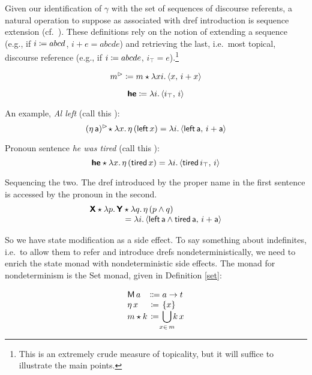 	Given our identification of $\gamma$ with the set of sequences of discourse referents, a natural operation to suppose as associated with dref introduction is sequence extension (cf.~\citealt{Groote:2006, Unger:2012, Charlow:diss}). These definitions rely on the notion of extending a sequence (e.g., if $i \coloneqq abcd$, $i+e = abcde$) and retrieving the last, i.e.~most topical, discourse reference (e.g., if $i \coloneqq abcde$, $i_\top = e$).\footnote{This is an extremely crude measure of topicality, but it will suffice to illustrate the main points.}%
	\begin{defi}
		\[m^\rhd \coloneqq m \star \lambda xi.\,\langle x,\,i + x \rangle\]
	\end{defi}
	\begin{defi}
		\[\textbf{\textsf{he}} \coloneqq \lambda i.\,\langle i_\top,\,i \rangle\]
	\end{defi}
	
	An example, \emph{Al left} (call this ):
	\[(\eta\,\textsf{a})^\rhd\! \star \lambda x.\,\eta\,(\textsf{left}\,x) = \lambda i.\,\langle \textsf{left}\,\textsf{a},\,i+\textsf{a} \rangle\]%
	
	Pronoun sentence \emph{he was tired} (call this ):
	\[\textbf{\textsf{he}} \star \lambda x.\,\eta\,(\textsf{tired}\,x) = \lambda i.\,\langle \textsf{tired}\,i_\top,\,i \rangle\]%
	
	Sequencing the two. The dref introduced by the proper name in the first sentence is accessed by the pronoun in the second. %
	\[\begin{array}{r@{}l}
		\bsf{X} \star \lambda p.\,\bsf{Y}&{}\star \lambda q.\,\eta\,(p \wedge q) %
		\\
		&{}= \lambda i.\,\ab{\textsf{left}\,\textsf{a} \wedge \textsf{tired}\,\textsf{a},\,i+\textsf{a}}%
	\end{array}\]
	
	So we have state modification as a side effect. To say something about indefinites, i.e.~to allow them to refer and introduce drefs nondeterministically, we need to enrich the state monad with nondeterministic side effects. The monad for nondeterminism is the Set monad, given in Definition \ref{set}:%
	\begin{defi}\label{set}
		\[\begin{array}[t]
			{@{}l@{}c@{}l@{}}
			\textsf{M}\,a &{}\Coloneqq{} &a \ra t%
			\\
			\eta\,x &{}\ceq{} &\{x\}
			\\
			m \star k &{}\ceq{} &\displaystyle\bigcup_{\mathclap{x\in \,m}}k\,x%
		\end{array}\]
	\end{defi} 

